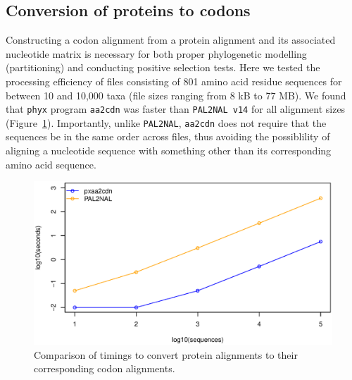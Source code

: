 \documentclass{article}
\begin{document}
\subsection{Conversion of proteins to codons}
Constructing a codon alignment from a protein alignment and its associated nucleotide matrix is necessary for both proper phylogenetic modelling (partitioning) and conducting positive selection tests. Here we tested the processing efficiency of files consisting of 801 amino acid residue sequences for between 10 and 10,000 taxa (file sizes ranging from 8 kB to 77 MB). We found that \texttt{phyx} program \texttt{aa2cdn} was faster than \texttt{PAL2NAL v14} \citep{Suyama2006} for all alignment sizes (Figure~\ref{fig:S2}). Importantly, unlike \texttt{PAL2NAL}, \texttt{aa2cdn} does not require that the sequences be in the same order across files, thus avoiding the possiblility of aligning a nucleotide sequence with something other than its corresponding amino acid sequence.

\begin{figure}[!htbp]
    \centering
    \includegraphics[width=5.0in]{aa2cdn}
    \caption{Comparison of timings to convert protein alignments to
    their corresponding codon alignments.}
    \label{proteincodonfigure}
\label{fig:S2}
\end{figure}
\end{document}
